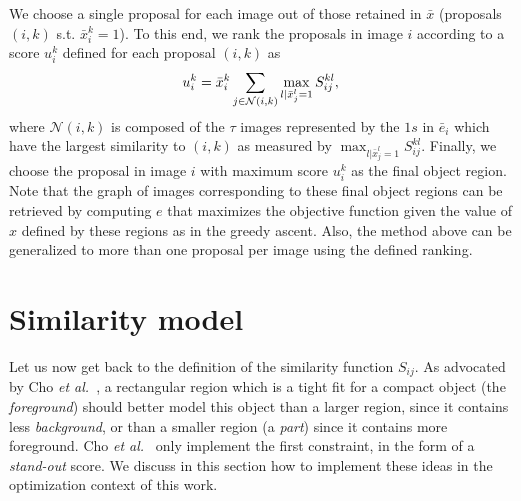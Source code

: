 \documentclass[10pt,twocolumn,letterpaper]{article}
\numberwithin{theorem}{section}
\begin{document}
We choose a single proposal for each image out of those retained in $\bar{x}$ (proposals $(i,k)$ s.t. $\bar{x}_i^k=1$). To this end, we rank the proposals in image $i$ according to a score $u_i^k$ defined for each proposal $(i,k)$ as
\vspace{-1mm}
\begin{equation}
u_i^k = \bar{x}_i^k \sum_{j \in \mathcal{N}(i,k)} \max_{l | \bar{x}_j^l=1} S_{ij}^{kl},
\label{eq:sim}
\vspace{-1mm}
\end{equation}
where 
$\mathcal{N}(i,k)$ is composed of the $\tau$ images represented by the $1s$ in $\bar{e}_i$ which have the largest similarity to $(i,k)$ as measured by $\max_{l | \bar{x}_j^l=1} S_{ij}^{kl}$. Finally, we choose the proposal in image $i$ with maximum score $u_i^k$ as the final object region. Note that the graph of images corresponding to these final object regions can be retrieved by computing $e$ that maximizes the objective function given the value of $x$ defined by these regions as in the greedy ascent. Also, the method above can be generalized to more than one proposal per image using the defined ranking.




 
\section{Similarity model\label{sec:similarity_model}}

Let us now get back to the definition of the similarity function
$S_{ij}$. As advocated by Cho {\em et al.}~\cite{CKSP15}, a
rectangular region which is a tight fit for a compact object (the {\em
  foreground}) should better model this object than a larger region,
since it contains less {\em background}, or than a smaller region (a
{\em part}) since it contains more foreground. Cho {\em et al.}~\cite{CKSP15} only
implement the first constraint, in the form of a {\em stand-out}
score. We discuss in this section how to implement these ideas in the
optimization context of this work.
\end{document}
